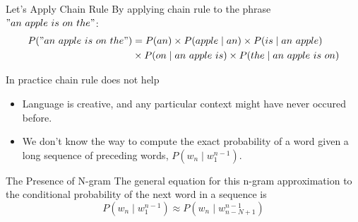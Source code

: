 \documentclass{beamer}
\begin{document}
\begin{frame}{Let's Apply Chain Rule}
By applying chain rule to the phrase $"an\ apple\ is\ on\ the"$:
    \begin{align*}
        P("an\ apple\ is\ on\ the") &= P(an)\times P(apple\mid an) \times P(is\mid an\ apple)\\
                                  &\times P(on\mid an\ apple\ is) \times P(the\mid an\ apple\ is\ on) 
    \end{align*}
\end{frame}

\begin{frame}{In practice chain rule does not help}
    \begin{itemize}[<+->]
        \item Language is creative, and any particular context might have never occured before.
        \item We don't know the way to compute the exact probability of a word given a long sequence of preceding words, $P(w_n\mid w_1^{n-1})$.
    \end{itemize}


\end{frame}

\begin{frame}{The Presence of N-gram}
    The general equation for this n-gram approximation to the conditional probability of the next word in a sequence is
    $$P(w_n\mid w_1^{n-1}) \approx P(w_n\mid w_{n-N+1}^{n-1})$$


\end{frame}
\end{document}
